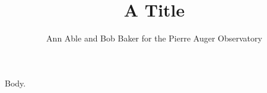\documentclass{article}
\begin{document}
\title{A Title}
\author{Ann Able and Bob Baker for the Pierre Auger Observatory}
\maketitle
Body.
\end{document}
